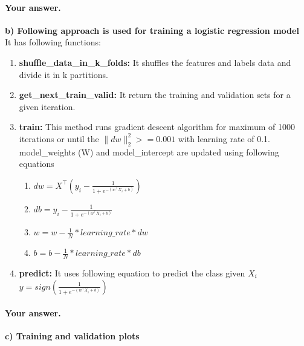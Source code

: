 \documentclass[11pt]{scrartcl}
\begin{document}
	\paragraph{Your answer.}
	\textbf{b) Following approach is used for training a logistic regression model}\\
	It has following functions:
	\begin{enumerate}
		\item \textbf{shuffle\_data\_in\_k\_folds:} It shuffles the features and labels data and divide it in k partitions.
		\item \textbf{get\_next\_train\_valid:} It return the training and validation sets for a given iteration.
		\item \textbf{train:} This method runs gradient descent algorithm for maximum of 1000 iterations or until the $\|dw\|_2^2 >= 0.001$ with learning rate of 0.1. model\_weights (W) and model\_intercept are updated using following equations\\
		\begin{enumerate}
			\item $dw = X^\intercal (y_i - \frac{1}{1+e^{-(w^\intercal X_i + b)}})$
			\item $db = y_i - \frac{1}{1+e^{-(w^\intercal X_i +b)}}$
			\item $w = w - \frac{1}{N}*learning\_rate * dw$
			\item $b = b - \frac{1}{N}*learning\_rate * db$
		\end{enumerate}
		\item \textbf{predict:} It uses following equation to predict the class given $X_i$\\
		$y = sign(\frac{1}{1+e^{-(w^\intercal X_i + b)}})$
	\end{enumerate}
	
	\paragraph{Your answer.}
	\textbf{c) Training and validation plots}
	
\end{document}
